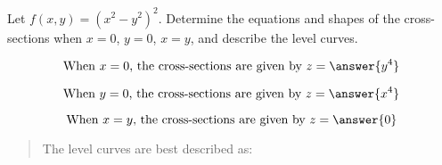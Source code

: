 \documentclass{ximera}
\author{David Guichard \and Neal Koblitz \and H. Jerome Keisler \and Albert Scheller \and Barry Balof \and Mike Wills \and Matthew Carr}
\begin{document}
\begin{exercise}




Let $f(x,y)=(x^2-y^2)^2$. Determine the equations and shapes of the cross-sections when $x=0$, $y=0$, $x=y$, and describe the level curves.

\begin{prompt}
\[
\text{When $x=0$, the cross-sections are given by } z=\answer{y^4}
\]
\end{prompt}
\begin{prompt}
\[
\text{When $y=0$, the cross-sections are given by } z=\answer{x^4}
\]
\end{prompt}
\begin{prompt}
\[
\text{When $x=y$, the cross-sections are given by } z=\answer{0}
\]
\end{prompt}

\begin{quote}
The level curves are best described as:
\end{quote}
\begin{multipleChoice}
\end{multipleChoice}


\end{exercise}
\end{document}
